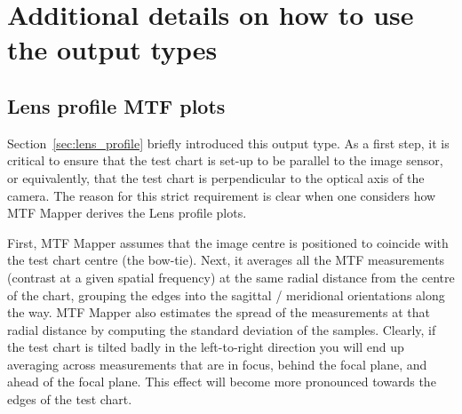\documentclass[a4paper]{article}
\begin{document}
\newpage

\section{Additional details on how to use the output types}

\subsection{Lens profile MTF plots}
Section~\ref{sec:lens_profile} briefly introduced this output type. As a
first step, it is critical to ensure that the test chart is set-up to be
parallel to the image sensor, or equivalently, that the test chart is
perpendicular to the optical axis of the camera. The reason for this strict
requirement is clear when one considers how MTF Mapper derives the
\textsf{Lens profile} plots.

First, MTF Mapper assumes that the image centre is positioned to coincide
with the test chart centre (the bow-tie). Next, it averages all the MTF
measurements (contrast at a given spatial frequency) at the same radial
distance from the centre of the chart, grouping the edges into the sagittal
/ meridional orientations along the way. MTF Mapper also estimates the
spread of the measurements at that radial distance by computing the standard
deviation of the samples. Clearly, if the test chart is tilted badly in the
left-to-right direction you will end up averaging across measurements that
are in focus, behind the focal plane, and ahead of the focal plane. This
effect will become more pronounced towards the edges of the test chart.
\end{document}
